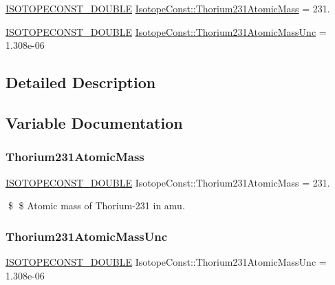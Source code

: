 \begin{DoxyCompactItemize}
\item 
\mbox{\hyperlink{group___isotope_const-_macros_ga8f45a7272ce02c0b4c65c44636ed719a}{I\+S\+O\+T\+O\+P\+E\+C\+O\+N\+S\+T\+\_\+\+D\+O\+U\+B\+LE}} \mbox{\hyperlink{group___isotope_const-_thorium-_th231_ga95fc64a24d9bde46ad2c1247a5ef2a06}{Isotope\+Const\+::\+Thorium231\+Atomic\+Mass}} = 231.
\item 
\mbox{\hyperlink{group___isotope_const-_macros_ga8f45a7272ce02c0b4c65c44636ed719a}{I\+S\+O\+T\+O\+P\+E\+C\+O\+N\+S\+T\+\_\+\+D\+O\+U\+B\+LE}} \mbox{\hyperlink{group___isotope_const-_thorium-_th231_ga0f4aadc289b7ed312b1f54cac1f37c8d}{Isotope\+Const\+::\+Thorium231\+Atomic\+Mass\+Unc}} = 1.\+308e-\/06
\end{DoxyCompactItemize}


\subsection{Detailed Description}


\subsection{Variable Documentation}
\mbox{\label{group___isotope_const-_thorium-_th231_ga95fc64a24d9bde46ad2c1247a5ef2a06}} 
\subsubsection{\texorpdfstring{Thorium231\+Atomic\+Mass}{Thorium231AtomicMass}}
{\footnotesize\ttfamily \mbox{\hyperlink{group___isotope_const-_macros_ga8f45a7272ce02c0b4c65c44636ed719a}{I\+S\+O\+T\+O\+P\+E\+C\+O\+N\+S\+T\+\_\+\+D\+O\+U\+B\+LE}} Isotope\+Const\+::\+Thorium231\+Atomic\+Mass = 231.}

\$ \$ Atomic mass of Thorium-\/231 in amu. \mbox{\label{group___isotope_const-_thorium-_th231_ga0f4aadc289b7ed312b1f54cac1f37c8d}} 
\subsubsection{\texorpdfstring{Thorium231\+Atomic\+Mass\+Unc}{Thorium231AtomicMassUnc}}
{\footnotesize\ttfamily \mbox{\hyperlink{group___isotope_const-_macros_ga8f45a7272ce02c0b4c65c44636ed719a}{I\+S\+O\+T\+O\+P\+E\+C\+O\+N\+S\+T\+\_\+\+D\+O\+U\+B\+LE}} Isotope\+Const\+::\+Thorium231\+Atomic\+Mass\+Unc = 1.\+308e-\/06}

